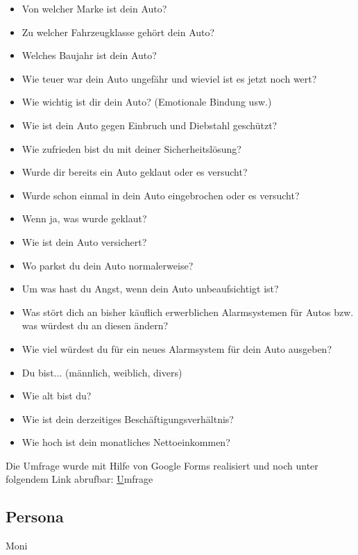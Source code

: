 \begin{itemize}
	\item Von welcher Marke ist dein Auto?
	\item Zu welcher Fahrzeugklasse gehört dein Auto?
	\item Welches Baujahr ist dein Auto?
	\item Wie teuer war dein Auto ungefähr und wieviel ist es jetzt noch wert?
	\item Wie wichtig ist dir dein Auto? (Emotionale Bindung usw.)
	\item Wie ist dein Auto gegen Einbruch und Diebstahl geschützt?
	\item Wie zufrieden bist du mit deiner Sicherheitslösung?
	\item Wurde dir bereits ein Auto geklaut oder es versucht?
	\item Wurde schon einmal in dein Auto eingebrochen oder es versucht?
	\item Wenn ja, was wurde geklaut?
	\item Wie ist dein Auto versichert?
	\item Wo parkst du dein Auto normalerweise?
	\item Um was hast du Angst, wenn dein Auto unbeaufsichtigt ist?
	\item Was stört dich an bisher käuflich erwerblichen Alarmsystemen für Autos bzw. was würdest du an diesen ändern?
	\item Wie viel würdest du für ein neues Alarmsystem für dein Auto ausgeben?
	\item Du bist... (männlich, weiblich, divers)
	\item Wie alt bist du?
	\item Wie ist dein derzeitiges Beschäftigungsverhältnis?
	\item Wie hoch ist dein monatliches Nettoeinkommen?
\end{itemize}
Die Umfrage wurde mit Hilfe von Google Forms realisiert und noch unter folgendem Link abrufbar: \href{https://forms.gle/qNTWM4qkF7ykG4tt9}Umfrage
\subsection{Persona} Moni


